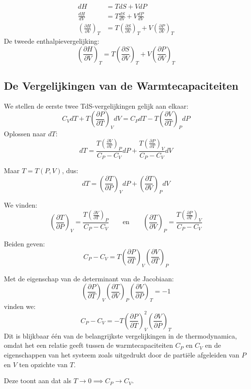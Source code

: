 \begin{align*}
    dH &= TdS + VdP \\
    \frac{dH}{dV} &= T \frac{d S}{d V}+ V \frac{dP}{dV} \\
    \left(\frac{\partial H}{\partial V}\right)_T &= T \left(\frac{\partial S}{\partial V}\right)_T + V \left(\frac{\partial P}{\partial V}\right)_T
\end{align*}
De tweede enthalpievergelijking:
\[\boxed{\left(\frac{\partial H}{\partial V}\right)_T = T \left(\frac{\partial S}{\partial V}\right)_T + V \left(\frac{\partial P}{\partial V}\right)_T}\]


\subsection{De Vergelijkingen van de Warmtecapaciteiten}

We stellen de eerste twee TdS-vergelijkingen gelijk aan elkaar:
\[C_V dT + T\left(\frac{\partial P}{\partial T}\right)_V dV = C_PdT - T\left(\frac{\partial V}{\partial T}\right)_P dP\]    
Oplossen naar \(dT\):
\[dT = \frac{T\left(\frac{\partial V}{\partial T}\right)_P }{C_P - C_V}dP + \frac{T\left(\frac{\partial P}{\partial T}\right)_V }{C_P - C_V}dV\]  

Maar \(T=T(P,V)\), dus:
\[dT = \left(\frac{\partial T}{\partial P}\right)_V dP + \left(\frac{\partial T}{\partial V}\right)_P dV\]

We vinden:
\[
\left(\frac{\partial T}{\partial P}\right)_V = \frac{T\left(\frac{\partial V}{\partial T}\right)_P }{C_P - C_V}
\qquad\text{en}\qquad
\left(\frac{\partial T}{\partial V}\right)_P = \frac{T\left(\frac{\partial P}{\partial T}\right)_V }{C_P - C_V}
\]

Beiden geven:
\[
C_P - C_V = T \left(\frac{\partial P}{\partial T}\right)_V \left(\frac{\partial V}{\partial T}\right)_P
\]

Met de eigenschap van de determinant van de Jacobiaan:
\[\left(\frac{\partial P}{\partial T}\right)_V \left(\frac{\partial T}{\partial V}\right)_P \left(\frac{\partial V}{\partial P}\right)_T = -1\] 
vinden we:
\[\boxed{C_P - C_V = -T \left(\frac{\partial P}{\partial T}\right)_V^2 \left(\frac{\partial V}{\partial P}\right)_T}\]  
Dit is blijkbaar één van de belangrijkste vergelijkingen in de thermodynamica, omdat het een relatie geeft tussen de warmtecapaciteiten \(C_P\) en \(C_V\) en de eigenschappen van het systeem zoals uitgedrukt door de partiële afgeleiden van \(P\) en \(V\) ten opzichte van \(T\).

Deze toont aan dat als \(T \to 0 \implies C_P \to C_V\).

